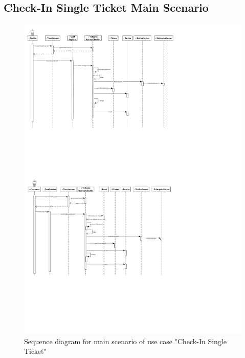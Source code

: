 \subsection{Check-In Single Ticket Main Scenario}

\begin{figure}
\centerline{\includegraphics[width=\textwidth]{"img/sequence_diagrams/SequenceDiagram_CheckInSingleTicket_cash"}}
\caption{Sequence diagram for main scenario of use case "Check-In Single Ticket"}
\label{fig:seq_single_ticket_main}
\end{figure}


